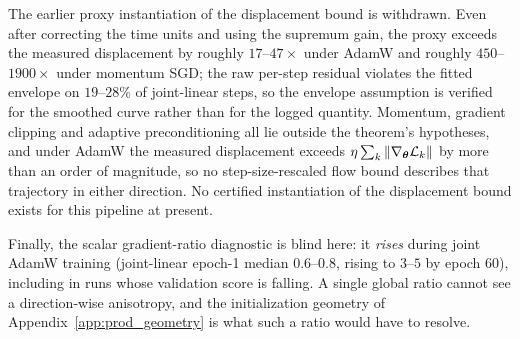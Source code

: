 The earlier proxy instantiation of the displacement bound is withdrawn. Even
after correcting the time units and using the supremum gain, the proxy exceeds
the measured displacement by roughly $17$--$47\times$ under AdamW and roughly
$450$--$1900\times$ under momentum SGD; the raw per-step residual violates the
fitted envelope on $19$--$28\%$ of joint-linear steps, so the envelope
assumption is verified for the smoothed curve rather than for the logged
quantity. Momentum, gradient clipping and adaptive preconditioning all lie
outside the theorem's hypotheses, and under AdamW the measured displacement
exceeds $\eta\sum_k\left\lVert\nabla_{\boldsymbol{\theta}}\mathcal{L}_k\right\rVert$ by more than an order of
magnitude, so no step-size-rescaled flow bound describes that trajectory in
either direction. No certified instantiation of the displacement bound exists
for this pipeline at present.

Finally, the scalar gradient-ratio diagnostic is blind here: it \emph{rises}
during joint AdamW training (joint-linear epoch-1 median $0.6$--$0.8$, rising
to $3$--$5$ by epoch $60$), including in runs whose validation score is
falling. A single global ratio cannot see a direction-wise anisotropy, and the
initialization geometry of Appendix~\ref{app:prod_geometry} is what such a
ratio would have to resolve.
